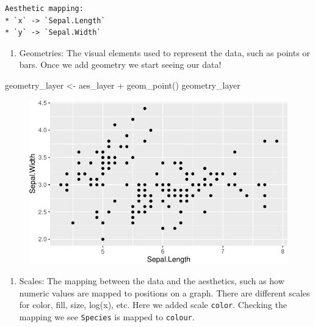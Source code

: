 \documentclass[
  letterpaper,
]{book}
\newenvironment{Shaded}{\begin{snugshade}}{\end{snugshade}}
\newcommand{\FunctionTok}[1]{\textcolor[rgb]{0.28,0.35,0.67}{#1}}
\newcommand{\NormalTok}[1]{\textcolor[rgb]{0.00,0.23,0.31}{#1}}
\newcommand{\OtherTok}[1]{\textcolor[rgb]{0.00,0.23,0.31}{#1}}
\newcommand{\SpecialCharTok}[1]{\textcolor[rgb]{0.37,0.37,0.37}{#1}}
\providecommand{\tightlist}{%
  \setlength{\itemsep}{0pt}\setlength{\parskip}{0pt}}\usepackage{longtable,booktabs,array}
\begin{document}
\begin{verbatim}
Aesthetic mapping: 
* `x` -> `Sepal.Length`
* `y` -> `Sepal.Width`
\end{verbatim}

\begin{enumerate}
\def\labelenumi{\arabic{enumi}.}
\setcounter{enumi}{2}
\tightlist
\item
  Geometries: The visual elements used to represent the data, such as
  points or bars. Once we add geometry we start seeing our data!
\end{enumerate}

\begin{Shaded}
\begin{Highlighting}[]
\NormalTok{geometry\_layer }\OtherTok{\textless{}{-}}\NormalTok{ aes\_layer }\SpecialCharTok{+} \FunctionTok{geom\_point}\NormalTok{()}
\NormalTok{geometry\_layer}
\end{Highlighting}
\end{Shaded}

\begin{figure}[H]

{\centering \includegraphics{./data_viz_files/figure-pdf/unnamed-chunk-8-1.pdf}

}

\end{figure}

\begin{enumerate}
\def\labelenumi{\arabic{enumi}.}
\setcounter{enumi}{3}
\tightlist
\item
  Scales: The mapping between the data and the aesthetics, such as how
  numeric values are mapped to positions on a graph. There are different
  scales for color, fill, size, log(x), etc. Here we added scale
  \texttt{color}. Checking the mapping we see \texttt{Species} is mapped
  to \texttt{colour}.
\end{enumerate}
\end{document}
